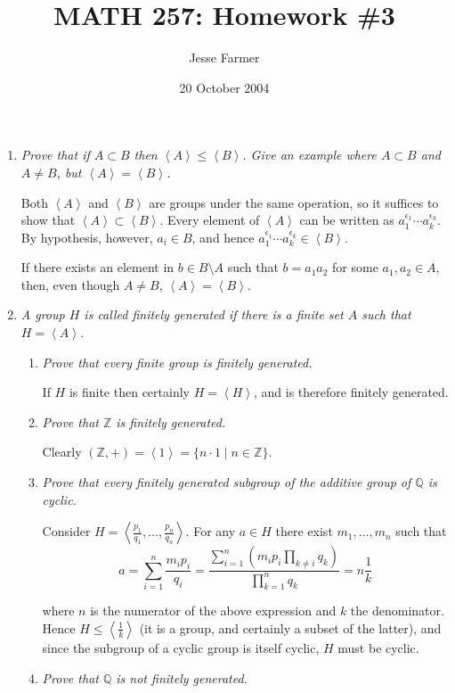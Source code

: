 \documentclass[letterpaper, 11pt]{article}
\title{MATH 257: Homework \#3}
\author{Jesse Farmer}
\date{20 October 2004}
\newcommand{\brac}[1]{
\left\langle #1 \right\rangle
}
\begin{document}
\maketitle
\begin{enumerate}

\item \emph{Prove that if $A \subset B$ then $\brac{A} \leq \brac{B}$.  Give an example where $A \subset B$ and $A \neq B$, but $\brac{A} = \brac{B}$.}

Both $\brac{A}$ and $\brac{B}$ are groups under the same operation, so it suffices to show that $\brac{A} \subset \brac{B}$.  Every element of $\brac{A}$ can be written as $a_1^{\epsilon_1} \cdots a_k^{\epsilon_k}$.  By hypothesis, however, $a_i \in B$, and hence $a_1^{\epsilon_1} \cdots a_k^{\epsilon_k} \in \brac{B}$.

If there exists an element in $b \in B \setminus A$ such that $b = a_1a_2$ for some $a_1, a_2 \in A$, then, even though $A \neq B$, $\brac{A} = \brac{B}$.

\item \emph{A group $H$ is called \emph{finitely generated} if there is a finite set $A$ such that $H = \brac{A}$.}
\begin{enumerate}
\item \emph{Prove that every finite group is finitely generated.}

If $H$ is finite then certainly $H = \brac{H}$, and is therefore finitely generated.

\item \emph{Prove that $\mathbb{Z}$ is finitely generated.}

Clearly $(\mathbb{Z},+) = \brac{1} = \{n \cdot 1 \mid n \in \mathbb{Z}\}$.

\item \emph{Prove that every finitely generated subgroup of the additive group of $\mathbb{Q}$ is cyclic.}

Consider $H = \brac{\frac{p_1}{q_1}, \ldots, \frac{p_n}{q_n}}$.  For any $a \in H$ there exist $m_1, \ldots, m_n$ such that 
\[
a = \sum_{i=1}^n \frac{m_ip_i}{q_i} = \frac{\sum_{i=1}^n \left( m_ip_i \prod_{k \neq i} q_k \right)}{\prod_{k=1}^n q_k} = n \frac{1}{k}
\]

where $n$ is the numerator of the above expression and $k$ the denominator.  Hence $H \leq \brac{\frac{1}{k}}$ (it is a group, and certainly a subset of the latter), and since the subgroup of a cyclic group is itself cyclic, $H$ must be cyclic.

\item \emph{Prove that $\mathbb{Q}$ is not finitely generated.}


\end{enumerate}
\end{enumerate}
\end{document}
